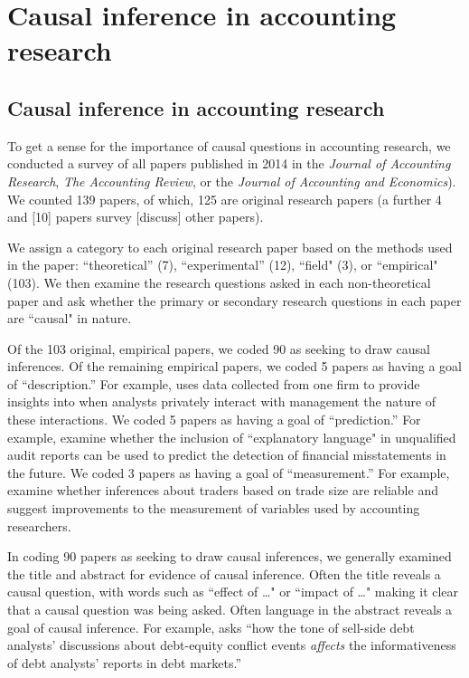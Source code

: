 \section{Causal inference in accounting research}

\subsection{Causal inference in accounting research}
To get a sense for the importance of causal questions in accounting research,
we conducted a survey of all papers published in 2014 in the  \textit{Journal of Accounting Research}, \textit{The Accounting Review}, or the \textit{Journal of Accounting and Economics}).
We counted 139 papers, of which, 
125 are original research papers 
(a further 4 and
[10] papers survey [discuss] other
papers).

We assign a category to each original research paper based on the methods used in the paper: ``theoretical''  (7), ``experimental'' (12), ``field" (3), or ``empirical"  (103).
We then examine the research questions asked in each non-theoretical paper and
ask whether the primary or secondary research questions in each paper are
``causal" in nature.

Of the  103 original, empirical papers, we coded 90 as seeking to draw causal inferences. Of the remaining empirical papers, we coded 5 papers as having a goal of ``description.'' 
For example, \citet{Soltes:2013ba} uses data collected from one firm to provide insights into when analysts privately interact with management the nature of these interactions.
We coded 5 papers as having a goal of ``prediction.'' 
For example, \citet{Czerney:2014bv} examine whether the inclusion of ``explanatory language" in unqualified audit reports can be used to predict the detection of financial misstatements in the future.
We coded 3 papers as having a goal of ``measurement.'' 
For example, \citet{Cready:2014ji} examine whether inferences about traders based on trade size are reliable and suggest improvements to the measurement of variables used by accounting researchers. 

In coding 90 papers as seeking to draw causal inferences, we generally examined the title and
abstract for evidence of causal inference. Often the title reveals a causal question, with words such as  ``effect of \dots" or ``impact of \dots"  
\citep[e.g.][]{Cohen:2014jl,Clorproell:2014cv} making it clear that a causal question was being asked. 
Often language in the abstract reveals a goal of causal inference. For example, \citet{deFranco:2014ct} asks ``how the tone of sell-side debt analysts’ discussions about debt-equity conflict events \emph{affects} the informativeness of debt analysts’ reports in debt markets.''

